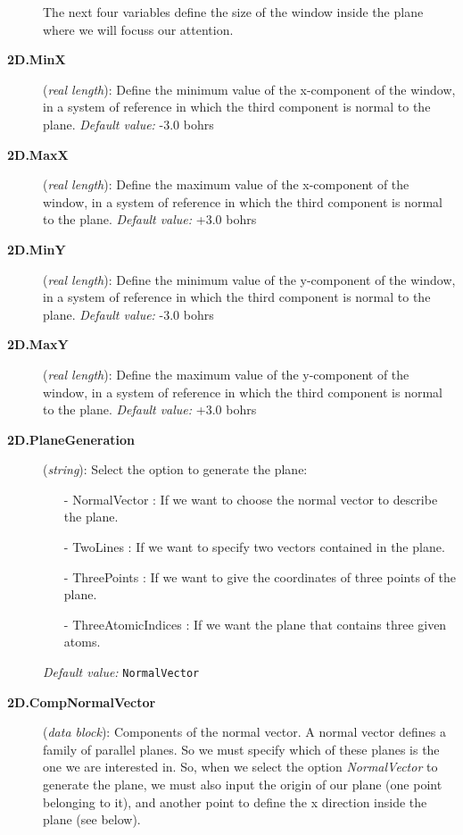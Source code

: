 \begin{description}
\noindent 
 The next four variables define the size of the window inside the plane where
 we will focuss our attention.

\item[{\bf 2D.MinX}] ({\it real length}):
 Define the minimum value of the x-component of the window, in a system 
 of reference in which the third component is normal to the plane.
{\it Default value:} -3.0 bohrs

\item[{\bf 2D.MaxX}] ({\it real length}):
 Define the maximum value of the x-component of the window, in a system 
 of reference in which the third component is normal to the plane.
{\it Default value:} +3.0 bohrs

\item[{\bf 2D.MinY}] ({\it real length}):
 Define the minimum value of the y-component of the window, in a system 
 of reference in which the third component is normal to the plane.
{\it Default value:} -3.0 bohrs

\item[{\bf 2D.MaxY}] ({\it real length}):
 Define the maximum value of the y-component of the window, in a system 
 of reference in which the third component is normal to the plane.
{\it Default value:} +3.0 bohrs

\item[{\bf 2D.PlaneGeneration}] ({\it string}): 
 Select the option to generate the plane:

\begin{itemize}
\item[-] NormalVector : If we want to choose the normal vector to describe the
                        plane.
\item[-] TwoLines       : If we want to specify two vectors contained in the 
                        plane.
\item[-] ThreePoints  : If we want to give the coordinates of three points 
                        of the plane.
\item[-] ThreeAtomicIndices : If we want the plane that contains three 
                        given atoms.
\end{itemize}
\noindent
{\it Default value:} {\tt NormalVector}


\item[{\bf 2D.CompNormalVector}] ({\it data block}): 
Components of the normal vector. A normal vector defines a family of parallel
planes. So we must specify which of these planes is the one 
 we are interested in.
So, when we select the option {\it NormalVector} to generate the plane, we must 
also input the origin of our plane (one point belonging to it), and another
point to define the x direction inside the plane (see below).


\end{description}

